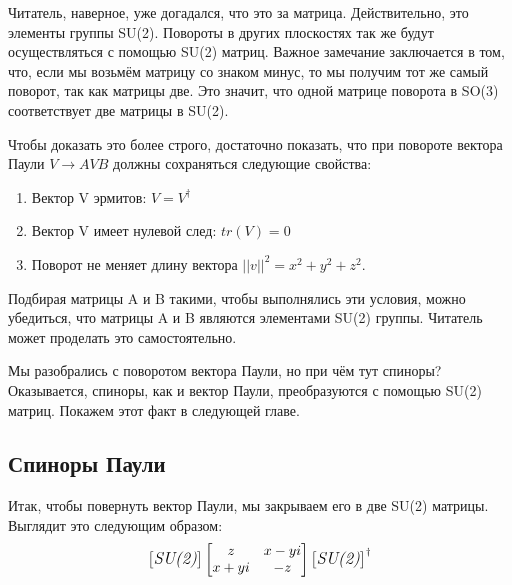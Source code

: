 Читатель, наверное, уже догадался, что это за матрица. Действительно, это элементы группы SU(2). Повороты в других плоскостях так же будут осуществляться с помощью SU(2) матриц. Важное замечание заключается в том, что, если мы возьмём матрицу со знаком минус, то мы получим тот же самый поворот, так как матрицы две. Это значит, что одной матрице поворота в SO(3) соответствует две матрицы в SU(2).

Чтобы доказать это более строго, достаточно показать, что при повороте вектора Паули $V \rightarrow AVB$ должны сохраняться следующие свойства:
\begin{enumerate}
    \item Вектор V эрмитов: $V = V^{\dagger}$
    \item Вектор V имеет нулевой след: $tr(V) = 0$
    \item Поворот не меняет длину вектора $||v||^2 = x^2 + y^2 + z^2$.
\end{enumerate}
Подбирая матрицы A и B такими, чтобы выполнялись эти условия, можно убедиться, что матрицы A и B являются элементами SU(2) группы. Читатель может проделать это самостоятельно.

Мы разобрались с поворотом вектора Паули, но при чём тут спиноры? Оказывается, спиноры, как и вектор Паули, преобразуются с помощью SU(2) матриц. Покажем этот факт в следующей главе.

\subsection{Спиноры Паули}
Итак, чтобы повернуть вектор Паули, мы закрываем его в две SU(2) матрицы. Выглядит это следующим образом:
\[
\begin{bmatrix} \textit{\large{SU(2)}} \end{bmatrix} \begin{bmatrix} z & x-yi\\ x + yi & -z \end{bmatrix} \begin{bmatrix} \textit{\large{SU(2)}} \end{bmatrix}^{\dagger}
\]


